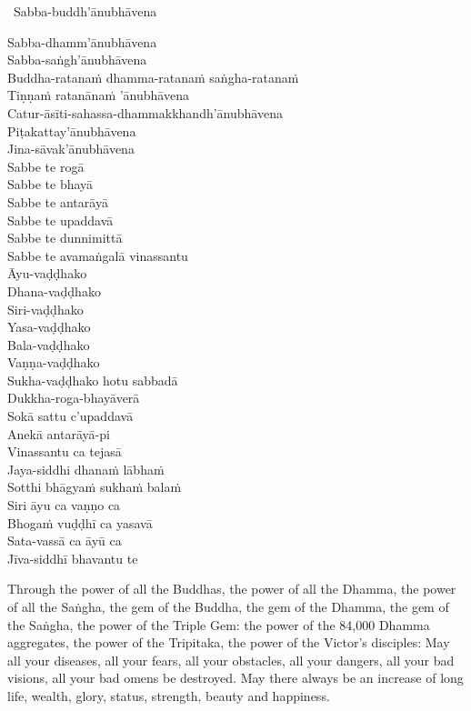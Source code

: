 \begin{pali-leader}
  \anglebracketleft\ \hspace{-0.5mm}Sabba-buddh'ānubhāvena \hspace{-0.5mm}\anglebracketright\
\end{pali-leader}
\begin{pali-hangtogether}
  Sabba-dhamm'ānubhāvena\\
  Sabba-saṅgh'ānubhāvena\\
  Buddha-ratanaṁ dhamma-ratanaṁ saṅgha-ratanaṁ\\
  Tiṇṇaṁ ratanānaṁ 'ānubhāvena\\
  Catur-āsīti-sahassa-dhammakkhandh'ānubhāvena\\
  Piṭakattay'ānubhāvena\\
  Jina-sāvak'ānubhāvena\\
  Sabbe te rogā\\
  Sabbe te bhayā\\
  Sabbe te antarāyā\\
  Sabbe te upaddavā\\
  Sabbe te dunnimittā\\
  Sabbe te avamaṅgalā vinassantu\\
  Āyu-vaḍḍhako\\
  Dhana-vaḍḍhako\\
  Siri-vaḍḍhako\\
  Yasa-vaḍḍhako\\
  Bala-vaḍḍhako\\
  Vaṇṇa-vaḍḍhako\\
  Sukha-vaḍḍhako hotu sabbadā\\
  Dukkha-roga-bhayāverā\\
  Sokā sattu c'upaddavā\\
  Anekā antarāyā-pi\\
  Vinassantu ca tejasā\\
  Jaya-siddhi dhanaṁ lābhaṁ\\
  Sotthi bhāgyaṁ sukhaṁ balaṁ\\
  Siri āyu ca vaṇṇo ca\\
  Bhogaṁ vuḍḍhī ca yasavā\\
  Sata-vassā ca āyū ca\\
  Jīva-siddhī bhavantu te
\end{pali-hangtogether}

\begin{english-verses}
  Through the power of all the Buddhas, the power of all the Dhamma, the power of all the Saṅgha, the gem of the Buddha, the gem of the Dhamma, the gem of the Saṅgha, the power of the Triple Gem: the power of the 84,000 Dhamma aggregates, the power of the Tripitaka, the power of the Victor's disciples: May all your diseases, all your fears, all your obstacles, all your dangers, all your bad visions, all your bad omens be destroyed. May there always be an increase of long life, wealth, glory, status, strength, beauty and happiness.
\end{english-verses}

